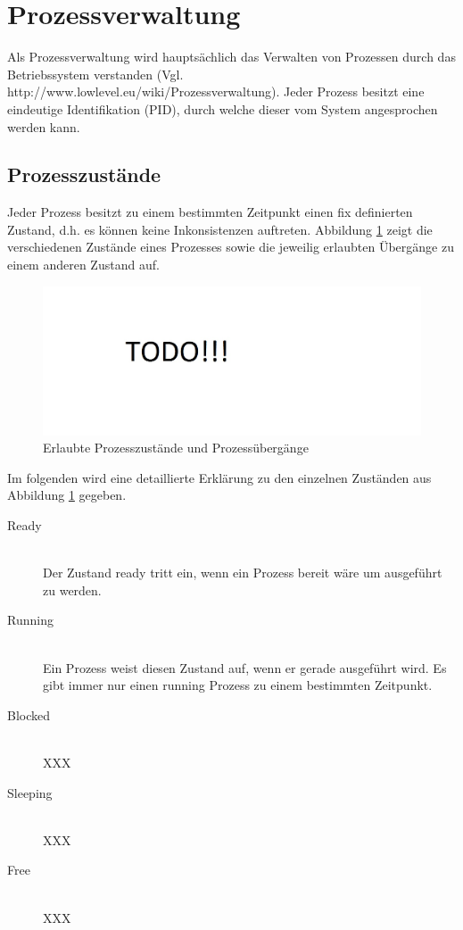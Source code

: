 \section{Prozessverwaltung}
\label{chapProcess}
Als Prozessverwaltung wird hauptsächlich das Verwalten von Prozessen durch das Betriebssystem verstanden (Vgl. http://www.lowlevel.eu/wiki/Prozessverwaltung). Jeder Prozess besitzt eine eindeutige Identifikation (PID), durch welche dieser vom System angesprochen werden kann. 

\subsection{Prozesszustände}
Jeder Prozess besitzt zu einem bestimmten Zeitpunkt einen fix definierten Zustand, d.h. es können keine Inkonsistenzen auftreten. Abbildung \ref{fig:Process-states} zeigt die verschiedenen Zustände eines Prozesses sowie die jeweilig erlaubten Übergänge zu einem anderen Zustand auf.

\begin{figure}[H]
	\includegraphics[scale=0.60]{chapters/processmanagement/figures/todo}
	\caption{Erlaubte Prozesszustände und Prozessübergänge}
	\label{fig:Process-states}
\end{figure}

Im folgenden wird eine detaillierte Erklärung zu den einzelnen Zuständen aus Abbildung \ref{fig:Process-states} gegeben.

\begin{description}
	\item[Ready] \hfill \\
	Der Zustand ready tritt ein, wenn ein Prozess bereit wäre um ausgeführt zu werden. 
	
	\item[Running] \hfill \\
	Ein Prozess weist diesen Zustand auf, wenn er gerade ausgeführt wird. Es gibt immer nur einen running Prozess zu einem bestimmten Zeitpunkt.
	
	\item[Blocked] \hfill \\
	XXX
	
	\item[Sleeping] \hfill \\
	XXX	
	
	\item[Free] \hfill \\
	XXX
\end{description}

